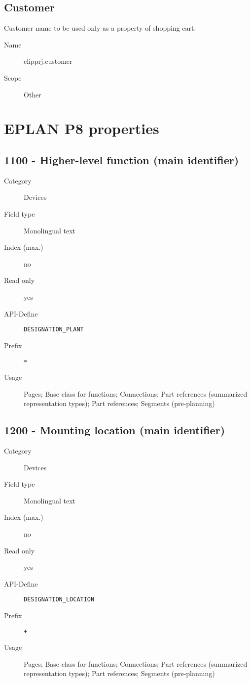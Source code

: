 \documentclass[%
	a4paper,
	oneside,
	listof=numbered,
	parskip=half,
	headsepline=true,
	footsepline=false,
	0.7headlines,
	]{scrbook}
\begin{document}
\subsection{Customer}

Customer name to be used only as a property of shopping cart.

\begin{description}
	\item[Name] clipprj.customer
	\item[Scope] Other
\end{description}

\section{EPLAN P8 properties}
\label{sec:p8_properties}

\subsection{1100 - Higher-level function (main identifier)}

\begin{description}
	\item[Category] Devices
	\item[Field type] Monolingual text
	\item[Index (max.)] no
	\item[Read only] yes
	\item[API-Define] \verb|DESIGNATION_PLANT|
	\item[Prefix] \verb|=|
	\item[Usage] Pages; Base class for functions; Connections; Part references (summarized representation types); Part references; Segments (pre-planning)
\end{description}

\subsection{1200 - Mounting location (main identifier)}

\begin{description}
	\item[Category] Devices
	\item[Field type] Monolingual text
	\item[Index (max.)] no
	\item[Read only] yes
	\item[API-Define] \verb|DESIGNATION_LOCATION|
	\item[Prefix] \verb|+|
	\item[Usage] Pages; Base class for functions; Connections; Part references (summarized representation types); Part references; Segments (pre-planning)
\end{description}
\end{document}
